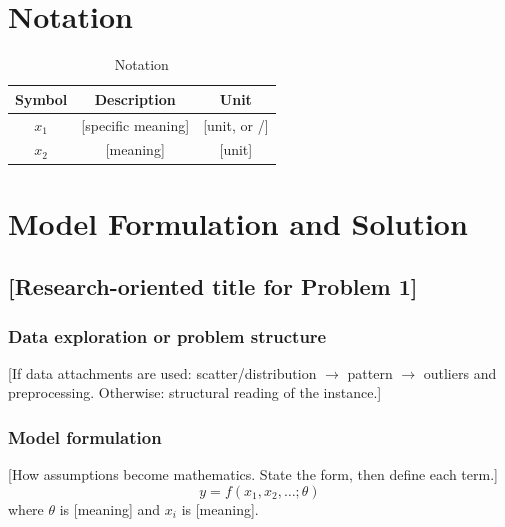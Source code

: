 \documentclass{swmcmthesis}
\begin{document}
\section{Notation}

\begin{table}[H]
\centering
\caption{Notation}
\label{tab:notation}
\begin{tabular}{ccc}
\toprule
Symbol & Description & Unit \\
\midrule
$x_1$ & [specific meaning] & [unit, or /] \\
$x_2$ & [meaning] & [unit] \\
\bottomrule
\end{tabular}
\end{table}

\section{Model Formulation and Solution}


\subsection{[Research-oriented title for Problem 1]}

\subsubsection{Data exploration or problem structure}

[If data attachments are used: scatter/distribution $\to$ pattern $\to$
outliers and preprocessing. Otherwise: structural reading of the instance.]

\subsubsection{Model formulation}

[How assumptions become mathematics. State the form, then define each term.]
\begin{equation}
y = f(x_1, x_2, \ldots; \theta)
\end{equation}
where $\theta$ is [meaning] and $x_i$ is [meaning].
\end{document}
